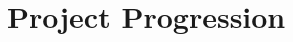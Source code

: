 \chapter{Project Progression}

\clearpage

\clearpage

\clearpage

\clearpage

\clearpage

\clearpage 